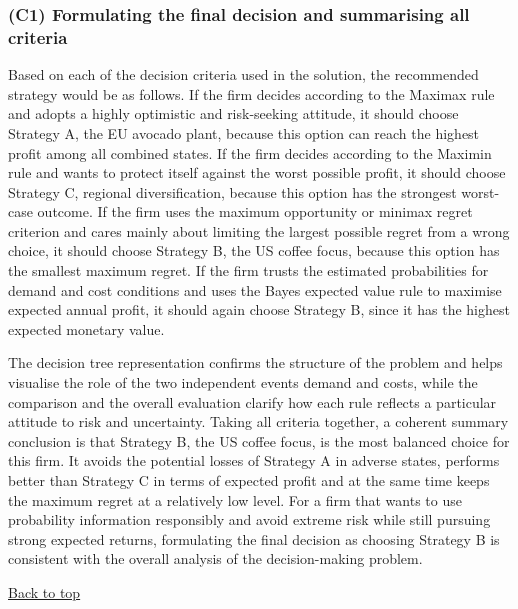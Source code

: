 	\subsubsection{(C1) Formulating the final decision and summarising all criteria}\label{subsubsec:example2-c1}
	
	Based on each of the decision criteria used in the solution, the recommended strategy would be as follows. If the firm decides according to the Maximax rule and adopts a highly optimistic and risk-seeking attitude, it should choose Strategy A, the EU avocado plant, because this option can reach the highest profit among all combined states. If the firm decides according to the Maximin rule and wants to protect itself against the worst possible profit, it should choose Strategy C, regional diversification, because this option has the strongest worst-case outcome. If the firm uses the maximum opportunity or minimax regret criterion and cares mainly about limiting the largest possible regret from a wrong choice, it should choose Strategy B, the US coffee focus, because this option has the smallest maximum regret. If the firm trusts the estimated probabilities for demand and cost conditions and uses the Bayes expected value rule to maximise expected annual profit, it should again choose Strategy B, since it has the highest expected monetary value.
	
	\medskip
	The decision tree representation confirms the structure of the problem and helps visualise the role of the two independent events demand and costs, while the comparison and the overall evaluation clarify how each rule reflects a particular attitude to risk and uncertainty. Taking all criteria together, a coherent summary conclusion is that Strategy B, the US coffee focus, is the most balanced choice for this firm. It avoids the potential losses of Strategy A in adverse states, performs better than Strategy C in terms of expected profit and at the same time keeps the maximum regret at a relatively low level. For a firm that wants to use probability information responsibly and avoid extreme risk while still pursuing strong expected returns, formulating the final decision as choosing Strategy B is consistent with the overall analysis of the decision-making problem.
	
	\medskip
	\noindent\hyperref[sec:example2]{Back to top}
